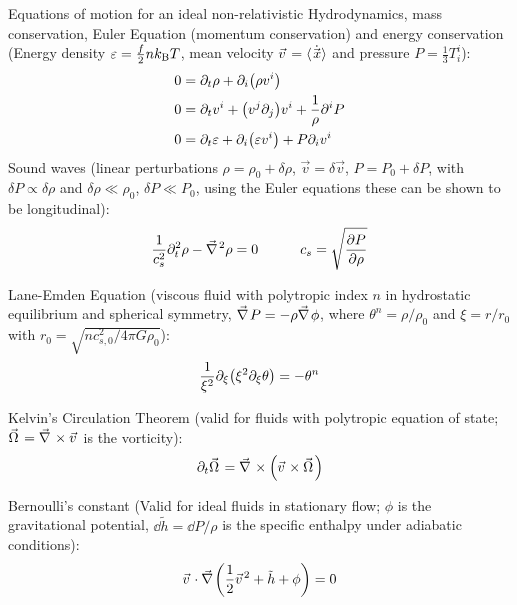 			\noindent
			Equations of motion for an ideal non-relativistic Hydrodynamics, \ie mass conservation, Euler Equation (momentum conservation) and energy conservation (Energy density $\varepsilon=\frac{f}{2} n k_{\text{B}} T$, mean velocity $\vec{v}=\avg{\dot{\vec{x}}}$ and pressure $P = \frac{1}{3} T^{i}_i$):
			\begin{align}
				0 &= \partial_t \rho + \partial_i \qty(\rho v^i) \\
				0 &= \partial_t v^i + \qty(v^j \partial_j) v^i + \frac{1}{\rho} \partial^i P \\
				0 &= \partial_t \varepsilon + \partial_i \qty(\varepsilon v^i) + P \partial_i v^i
			\end{align}
			\noindent
			Sound waves (linear perturbations $\rho = \rho_0 + \delta \rho$, $\vec{v} = \delta \vec{v}$, $P = P_0 + \delta P$, with $\delta P \propto \delta \rho$ and $\delta \rho \ll \rho_0$, $\delta P \ll P_0$, using the Euler equations these can be shown to be longitudinal):
			\begin{equation}
				\frac{1}{c_s^2} \partial_t^2 \rho - \Nabla^2 \rho = 0 \hsp c_s = \sqrt{\frac{\partial P}{\partial \rho}}
			\end{equation}

			\noindent
			Lane-Emden Equation (viscous fluid with polytropic index $n$ in hydrostatic equilibrium and spherical symmetry, \ie $\Nabla P = - \rho \Nabla \phi$, where $\theta^n = \rho/\rho_0$ and $\xi = r/r_0$ with $r_0 = \sqrt{n c_{s,0}^2 / 4\pi G \rho_0}$):
			\begin{equation}
				\frac{1}{\xi^2} \partial_\xi \qty(\xi^2 \partial_\xi \theta) = - \theta^n
			\end{equation}

			\noindent
			Kelvin's Circulation Theorem (valid for fluids with polytropic equation of state; $\vec{\Omega} = \Nabla \times \vec{v}$ is the vorticity):
			\begin{equation}
				\partial_t \vec{\Omega} = \Nabla \times \qty(\vec{v} \times \vec{\Omega})
			\end{equation}

			\noindent
			Bernoulli's constant (Valid for ideal fluids in stationary flow; $\phi$ is the gravitational potential, $\dd \tilde{h} = \dd P / \rho$ is the specific enthalpy under adiabatic conditions):
			\begin{equation}
				\vec{v}\cdot \Nabla \qty(\frac{1}{2}\vec{v}^2 + \tilde{h} + \phi) = 0
			\end{equation}

